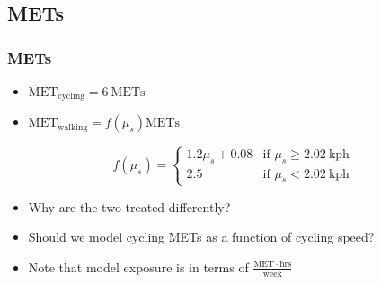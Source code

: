 \documentclass[handout,13pt,compress,c]{beamer}
\newcommand{\bi}{\begin{itemize}}
\newcommand{\ei}{\end{itemize}}
\begin{document}
\subsection{METs}
\begin{frame}[fragile]
\frametitle{METs}
\bi
\item $\mathbf{\mathrm{MET}}_\mathrm{cycling} = 6\ \mathrm{METs}$
\item $\mathbf{\mathrm{MET}}_\mathrm{walking} = f\left( \mu_s  \right) \mathrm{METs}$
\ei
\begin{equation}
f(\mu_s) = \begin{cases} 1.2\mu_s + 0.08 &\mbox{if } \mu_s \ge 2.02\ \mathrm{kph} \\
2.5 & \mbox{if } \mu_s < 2.02\ \mathrm{kph}\end{cases}
\end{equation}
\bi
\item Why are the two treated differently?
\item Should we model cycling METs as a function of cycling speed?
\item Note that model exposure is in terms of $\frac{\mathrm{MET}\cdot\mathrm{hrs}}{\mathrm{week}}$
\ei
\end{frame}
\end{document}
